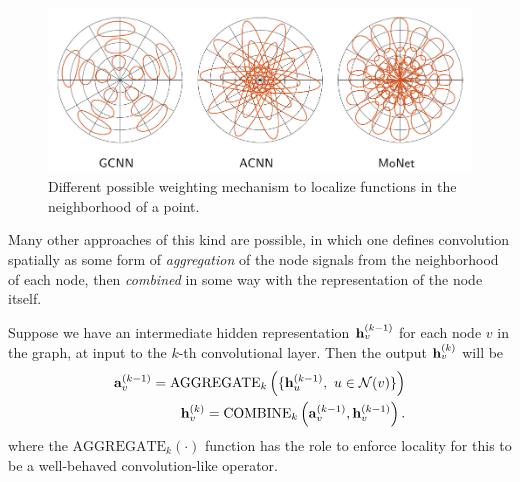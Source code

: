 \begin{figure}[H]
    \centering
    \includegraphics[width=.7\textwidth]{figures/12/monet.png}
    \caption{Different possible weighting mechanism to localize functions in the neighborhood of a point.}
\end{figure}

Many other approaches of this kind are possible, in which one defines convolution spatially as some form of \emph{aggregation} of the node signals from the neighborhood of each node, then \emph{combined} in some way with the representation of the node itself. 

Suppose we have an intermediate hidden representation $\vb{h}_v^{(k-1)}$ for each node $v$ in the graph, at input to the $k$-th convolutional layer. Then the output $\vb{h}_v^{(k)}$ will be
\begin{equation}
    \begin{aligned}
        \vb{a}_{v}^{(k-1)} = \mathrm{AGGREGATE}_k \left( \{ \vb{h}_u^{(k-1)}, ~ u \in \mathcal{N}(v) \} \right) \\
        \vb{h}_{v}^{(k)} = \mathrm{COMBINE}_k \left( \vb{a}_{v}^{(k-1)}, \vb{h}_v^{(k-1)} \right).
    \end{aligned}
\end{equation}
where the $\mathrm{AGGREGATE}_k(\cdot)$ function has the role to enforce locality for this to be a well-behaved convolution-like operator. 
